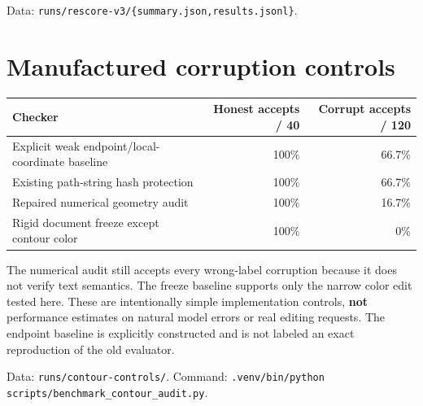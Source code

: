 \documentclass[
  11pt,
  a4paper,
]{article}
\newcounter{none} %
\begin{document}
Data: \texttt{runs/rescore-v3/\{summary.json,results.jsonl\}}.

\clearpage

\section{Manufactured corruption
controls}\label{manufactured-corruption-controls}

{\def\LTcaptype{none} %
\begin{longtable}[]{@{}lrr@{}}
\toprule\noalign{}
Checker & Honest accepts / 40 & Corrupt accepts / 120 \\
\midrule\noalign{}
\endhead
\bottomrule\noalign{}
\endlastfoot
Explicit weak endpoint/local-coordinate baseline & 100\% & 66.7\% \\
Existing path-string hash protection & 100\% & 66.7\% \\
Repaired numerical geometry audit & 100\% & 16.7\% \\
Rigid document freeze except contour color & 100\% & 0\% \\
\end{longtable}
}

The numerical audit still accepts every wrong-label corruption because
it does not verify text semantics. The freeze baseline supports only the
narrow color edit tested here. These are intentionally simple
implementation controls, \textbf{not} performance estimates on natural
model errors or real editing requests. The endpoint baseline is
explicitly constructed and is not labeled an exact reproduction of the
old evaluator.

Data: \texttt{runs/contour-controls/}. Command:
\nolinkurl{.venv/bin/python scripts/benchmark_contour_audit.py}.
\end{document}
